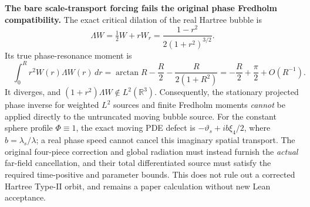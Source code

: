 \documentclass[11pt]{amsart}
\begin{document}
\medskip
\noindent\textbf{The bare scale-transport forcing fails the original
phase Fredholm compatibility.}
The exact critical dilation of the real Hartree bubble is
\[
 \Lambda W=\tfrac12W+rW_r
 =\frac{1-r^2}{2(1+r^2)^{3/2}}.
\]
Its true phase-resonance moment is
\[
 \boxed{\quad
 \int_0^R r^2W(r)\Lambda W(r)\,dr
 =\arctan R-\frac R2-\frac{R}{2(1+R^2)}
 =-\frac R2+\frac\pi2+O(R^{-1}).
 \quad}
\]
It diverges, and \((1+r^2)\Lambda W\notin
L^2(\mathbb R^3)\). Consequently, the stationary projected
phase inverse for weighted \(L^2\) sources and finite Fredholm
moments \emph{cannot} be applied directly to the untruncated
moving bubble source. For the constant sphere profile
\(\Phi\equiv1\), the exact moving PDE defect is
\(-\vartheta_s+ib\xi_4/2\), where \(b=\lambda_s/\lambda\);
a real phase speed cannot cancel this imaginary spatial
transport. The original four-piece correction and global
radiation must instead furnish the \emph{actual} far-field
cancellation, and their total differentiated source must
satisfy the required time-positive and parameter bounds.
This does not rule out a corrected Hartree Type-II orbit,
and remains a paper calculation without new Lean acceptance.
\end{document}
